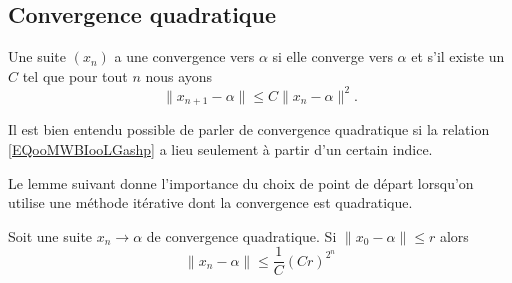 \subsection{Convergence quadratique}

\begin{definition}      \label{DEFooSUTRooAcXXjj}
    Une suite \( (x_n)\) a une convergence  vers \( \alpha\) si elle converge vers \( \alpha\) et s'il existe un \( C\) tel que pour tout \( n\) nous ayons
    \begin{equation}    \label{EQooMWBIooLGashp}
        \| x_{n+1}-\alpha \|\leq C\| x_n-\alpha \|^2.
    \end{equation}
\end{definition}
Il est bien entendu possible de parler de convergence quadratique si la relation \eqref{EQooMWBIooLGashp} a lieu seulement à partir d'un certain indice.

Le lemme suivant donne l'importance du choix de point de départ lorsqu'on utilise une méthode itérative dont la convergence est quadratique.
\begin{lemma}       \label{LEMooLQMAooICcmrn}
    Soit une suite \( x_n\to \alpha\) de convergence quadratique. Si \( \| x_0-\alpha \|\leq r\) alors
    \begin{equation}        \label{EQooVYRIooTxetPn}
        \| x_n-\alpha \|\leq \frac{1}{ C }(Cr)^{2^n}
    \end{equation}
\end{lemma}

